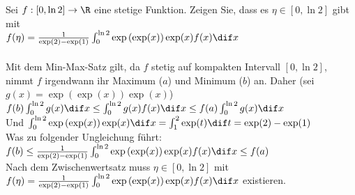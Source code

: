 \begin{example}
	Sei $f: [0,\ln 2] \to \R$ eine stetige Funktion. Zeigen Sie, dass es $\eta \in [0,\ln 2]$ gibt mit\\
    $f(\eta) = \frac{1}{\exp(2) -\exp(1)} \int_{0}^{\ln 2} \exp \left( \exp(x) \right) \exp(x) f(x) \dif x$\\ \\
	Mit dem Min-Max-Satz gilt, da $f$ stetig auf kompakten Intervall $[0,\ln 2]$, nimmt $f$ irgendwann ihr Maximum
	($a$) und Minimum ($b$) an. Daher (sei $g(x) = \exp \left( \exp(x) \right) \exp(x)$)\\
    $f(b) \int_{0}^{\ln 2} g(x) \dif x \leq \int_{0}^{\ln 2} g(x) f(x) \dif x \leq f(a) \int_{0}^{\ln 2} g(x) \dif x$\\
	Und $\int_{0}^{\ln 2} \exp \left( \exp(x) \right) \exp(x) \dif x = \int_{1}^{2} \exp(t) \dif t = \exp(2) - \exp(1)$\\
	Was zu folgender Ungleichung führt:\\
    $f(b) \leq \frac{1}{\exp(2) - \exp(1)} \int_{0}^{\ln 2} \exp \left( \exp(x) \right) \exp(x) f(x) \dif x
		\leq f(a)$\\
	Nach dem Zwischenwertsatz muss $\eta \in [0,\ln 2]$ mit\\
    $f(\eta) = \frac{1}{\exp(2) - \exp(1)} \int_{0}^{\ln 2} \exp \left( \exp(x) \right) \exp(x) f(x) \dif x$
	existieren.
\end{example}